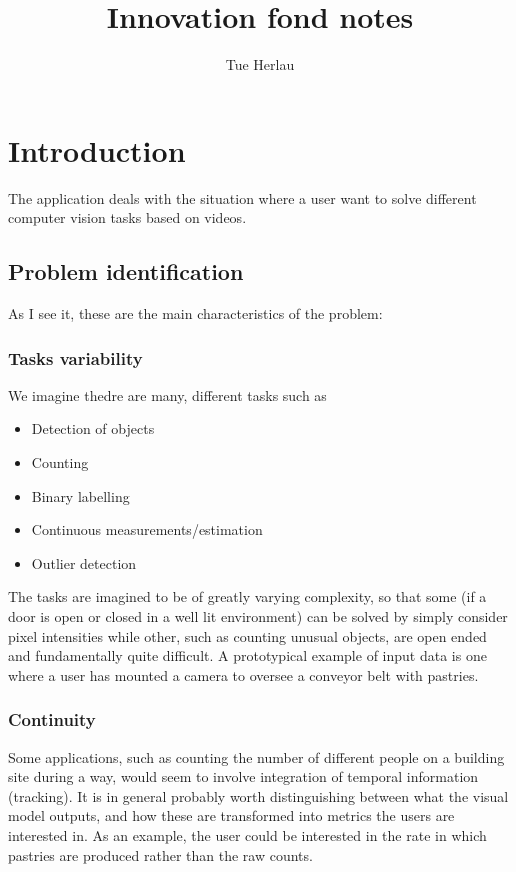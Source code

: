 \documentclass{article}
\title{Innovation fond notes}
\author{Tue Herlau}
\begin{document}
\maketitle


\section{Introduction}
The application deals with the situation where a user want to solve different computer vision tasks based on videos. 

\subsection{Problem identification}
As I see it, these are the main characteristics of the problem: 

\subsubsection{Tasks variability}
We imagine thedre are many, different tasks such as
\begin{itemize}
    \item Detection of objects
    \item Counting 
    \item Binary labelling
    \item Continuous measurements/estimation 
    \item Outlier detection
\end{itemize}
The tasks are imagined to be of greatly varying complexity, so that some (if a door is open or closed in a well lit environment) can be solved by simply consider pixel intensities while other, such as counting unusual objects, are open ended and fundamentally quite difficult. A prototypical example of input data is one where a user has mounted a camera to oversee a conveyor belt with pastries.

\subsubsection{Continuity}
Some applications, such as counting the number of different people on a building site during a way, would seem to involve integration of temporal information (tracking). It is in general probably worth distinguishing between what the visual model outputs, and how these are transformed into metrics the users are interested in. 
As an example, the user could be interested in the rate in which pastries are produced rather than the raw counts.
\end{document}
